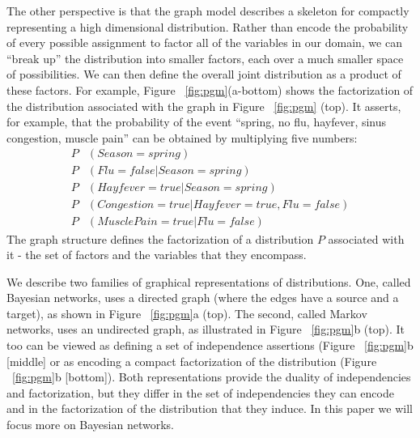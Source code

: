 The other perspective is that the graph model describes a skeleton for compactly representing a high dimensional distribution. Rather than encode the probability of every possible assignment to factor all of the variables in our domain, we can “break up” the distribution into smaller factors, each over a much smaller space of possibilities. We can then deﬁne the overall joint distribution as a product of these factors. For example, Figure ~\ref{fig:pgm}(a-bottom) shows the factorization of the distribution associated with the graph in Figure ~\ref{fig:pgm} (top). It asserts, for example, that the probability of the event “spring, no flu, hayfever, sinus congestion, muscle pain” can be obtained by multiplying five numbers:
\begin{align*}
  P&(Season = spring)\\
  P&(Flu = false | Season = spring)\\
  P&(Hayfever = true | Season = spring)\\
  P&(Congestion = true | Hayfever = true,Flu = false)\\
  P&(Muscle Pain = true | Flu = false)
\end{align*}
The graph structure deﬁnes the factorization of a distribution $P$ associated with it - the set of factors and the variables that they encompass.

We describe two families of graphical representations of distributions. One, called Bayesian networks, uses a directed graph (where the edges have a source and a target), as shown in Figure ~\ref{fig:pgm}a (top). The second, called Markov networks, uses an undirected graph, as illustrated in Figure ~\ref{fig:pgm}b (top). It too can be viewed as defining a set of independence assertions (Figure ~\ref{fig:pgm}b [middle] or as encoding a compact factorization of the distribution (Figure ~\ref{fig:pgm}b [bottom]). Both representations provide the duality of independencies and factorization, but they diﬀer in the set of independencies they can encode and in the factorization of the distribution that they induce. In this paper we will focus more on Bayesian networks.

